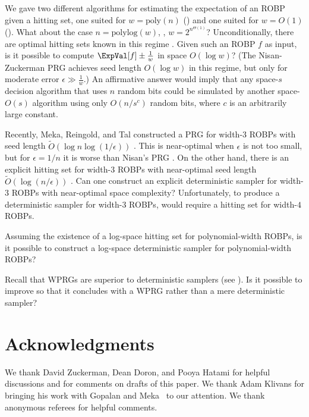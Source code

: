 We gave two different algorithms for estimating the expectation of an ROBP given a hitting set, one suited for $w = \text{poly}(n)$ () and one suited for $w = O(1)$ (). What about the case $n = \text{polylog}(w)$, \ie, $w = 2^{n^{\Theta(1)}}$? Unconditionally, there are optimal hitting sets known in this regime \cite{AKS87, HZ20}. Given such an ROBP $f$ as input, is it possible to compute $\ExpVal[f] \pm \frac{1}{w}$ in space $O(\log w)$? (The Nisan-Zuckerman PRG \cite{NZ96} achieves seed length $O(\log w)$ in this regime, but only for moderate error $\epsilon \gg \frac{1}{w}$.) An affirmative answer would imply that any space-$s$ decision algorithm that uses $n$ random bits could be simulated by another space-$O(s)$ algorithm using only $O(n / s^c)$ random bits, where $c$ is an arbitrarily large constant.

Recently, Meka, Reingold, and Tal constructed a PRG for width-$3$ ROBPs with seed length \linebreak $\widetilde{O}(\log n \log(1/\epsilon))$ \cite{MRT19}. This is near-optimal when $\epsilon$ is not too small, but for $\epsilon = 1/n$ it is worse than Nisan's PRG \cite{Nis92}. On the other hand, there is an explicit hitting set for width-$3$ ROBPs with near-optimal seed length $\widetilde{O}(\log(n/\epsilon))$ \cite{GMRTV12}. Can one construct an explicit deterministic sampler for width-$3$ ROBPs with near-optimal space complexity? Unfortunately, to produce a deterministic sampler for width-$3$ ROBPs,  would require a hitting set for width-$4$ ROBPs.

Assuming the existence of a log-space hitting set for polynomial-width ROBPs, is it possible to construct a log-space deterministic sampler for polynomial-width ROBPs?

Recall that WPRGs are superior to deterministic samplers (see ). Is it possible to improve  so that it concludes with a WPRG rather than a mere deterministic sampler?

\section{Acknowledgments}

We thank David Zuckerman, Dean Doron, and Pooya Hatami for helpful discussions and for comments on drafts of this paper. We thank Adam Klivans for bringing his work with Gopalan and Meka~\cite{GKM12} to our attention. We thank anonymous referees for helpful comments.
